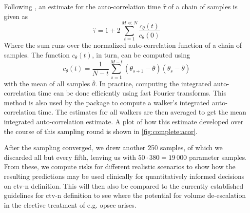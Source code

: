 \documentclass[\relativeRoot/main.tex]{subfiles}
\begin{document}
Following , an estimate for the auto-correlation time $\hat{\tau}$ of a chain of samples is given as
%
\begin{equation}
    \hat{\tau} = 1 + 2 \sum_{t=1}^{M \ll N}\frac{ c_\theta(t) }{ c_\theta(0) }
\end{equation}
%
Where the sum runs over the normalized auto-correlation function of a chain of samples. The function $c_\theta(t)$, in turn, can be computed using
%
\begin{equation}
    c_\theta(t) = \frac{1}{N-t} \sum_{s=1}^{M-t}{ \left( \theta_{s+1} - \bar{\theta} \right) \left( \theta_s - \bar{\theta} \right) }
\end{equation}
%
with the mean of all samples $\bar{\theta}$. In practice, computing the integrated auto-correlation time can be done efficiently using fast Fourier transforms. This method is also used by the  package to compute a walker's integrated auto-correlation time. The estimates for all walkers are then averaged to get the mean integrated auto-correlation estimate. A plot of how this estimate developed over the course of this sampling round is shown in \cref{fig:complete:acor}.

After the sampling converged, we drew another 250 samples, of which we discarded all but every fifth, leaving us with $50 \cdot 380 = 19\,000$ parameter samples. From these, we compute risks for different realistic scenarios to show how the resulting predictions may be used clinically for quantitatively informed decisions on \gls{ctv-n} definition. This will then also be compared to the currently established guidelines for \gls{ctv-n} definition to see where the potential for volume de-escalation in the elective treatment of e.g. \gls{opscc} arises.









\end{document}
